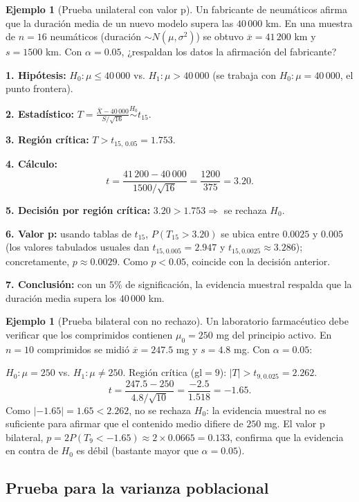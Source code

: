 \documentclass[11pt,a4paper]{article}
\theoremstyle{plain}
\theoremstyle{definition}
\newtheorem{ejemplo}[teorema]{Ejemplo}
\theoremstyle{remark}
\begin{document}
\begin{ejemplo}[Prueba unilateral con valor p]
Un fabricante de neumáticos afirma que la duración media de un nuevo modelo supera las $40\,000$ km. En una muestra de $n=16$ neumáticos (duración $\sim N(\mu,\sigma^2)$) se obtuvo $\overline x=41\,200$ km y $s=1500$ km. Con $\alpha=0.05$, ¿respaldan los datos la afirmación del fabricante?

\textbf{1. Hipótesis:} $H_0:\mu\le40\,000$ vs. $H_1:\mu>40\,000$ (se trabaja con $H_0:\mu=40\,000$, el punto frontera).

\textbf{2. Estadístico:} $\displaystyle T=\frac{\overline X-40\,000}{S/\sqrt{16}}\overset{H_0}{\sim} t_{15}$.

\textbf{3. Región crítica:} $T>t_{15,\,0.05}=1.753$.

\textbf{4. Cálculo:}
\[
t=\frac{41\,200-40\,000}{1500/\sqrt{16}}=\frac{1200}{375}=3.20.
\]

\textbf{5. Decisión por región crítica:} $3.20>1.753\Rightarrow$ se rechaza $H_0$.

\textbf{6. Valor p:} usando tablas de $t_{15}$, $P(T_{15}>3.20)$ se ubica entre $0.0025$ y $0.005$ (los valores tabulados usuales dan $t_{15,0.005}=2.947$ y $t_{15,0.0025}\approx3.286$); concretamente, $p\approx0.0029$. Como $p<0.05$, coincide con la decisión anterior.

\textbf{7. Conclusión:} con un $5\%$ de significación, la evidencia muestral respalda que la duración media supera los $40\,000$ km.
\end{ejemplo}

\begin{ejemplo}[Prueba bilateral con no rechazo]
Un laboratorio farmacéutico debe verificar que los comprimidos contienen $\mu_0=250$ mg del principio activo. En $n=10$ comprimidos se midió $\overline x=247.5$ mg y $s=4.8$ mg. Con $\alpha=0.05$:

$H_0:\mu=250$ vs. $H_1:\mu\neq250$. Región crítica (gl$=9$): $|T|>t_{9,0.025}=2.262$.
\[
t=\frac{247.5-250}{4.8/\sqrt{10}}=\frac{-2.5}{1.518}=-1.65.
\]
Como $|-1.65|=1.65<2.262$, no se rechaza $H_0$: la evidencia muestral no es suficiente para afirmar que el contenido medio difiere de $250$ mg. El valor p bilateral, $p=2P(T_9<-1.65)\approx 2\times0.0665= 0.133$, confirma que la evidencia en contra de $H_0$ es débil (bastante mayor que $\alpha=0.05$).
\end{ejemplo}

\subsection{Prueba para la varianza poblacional}
\end{document}
